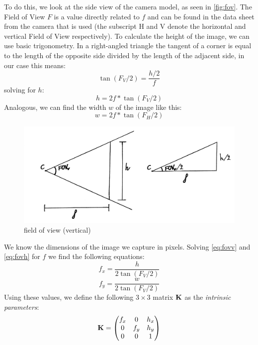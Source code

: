 To do this, we look at the side view of the camera model, as seen in \autoref{fig:fov}. The Field of View $F$ is a value directly related to $f$ and can be found in the data sheet from the camera that is used (the subscript H and V denote the horizontal and vertical Field of View respectively). To calculate the height of the image, we can use basic trigonometry. In a right-angled triangle the tangent of a corner is equal to the length of the opposite side divided by the length of the adjacent side, in our case this means:
\begin{equation}
    \tan(F_V/2) = \frac{h/2}{f}
\end{equation}\label{eq:fovv}
solving for $h$:
\begin{equation}
    h = 2f*\tan(F_V/2)
\end{equation}
Analogous, we can find the width $w$ of the image like this:
\begin{equation}\label{eq:fovh}
    w = 2f*\tan(F_H/2)
\end{equation}
\begin{figure}
    \centering
    \includegraphics[width=1\textwidth]{figures/field_of_view.jpg}
    \caption{field of view (vertical)}
    \label{fig:fov}
\end{figure}
We know the dimensions of the image we capture in pixels. Solving \autoref{eq:fovv} and \autoref{eq:fovh} for $f$ we find the following equations:
\begin{equation}
    f_x = \frac{h}{2\tan(F_V/2)}
\end{equation}
\begin{equation}
    f_y = \frac{w}{2\tan(F_V/2)}
\end{equation}
Using these values, we define the following $3\times3$ matrix $\mathbf{K}$ as the \textit{intrinsic parameters}:
\begin{equation}
    \mathbf{K} = \begin{pmatrix}
        f_x & 0 & h_x \\
        0 & f_y & h_y \\
        0 & 0 & 1
    \end{pmatrix}
\end{equation}
